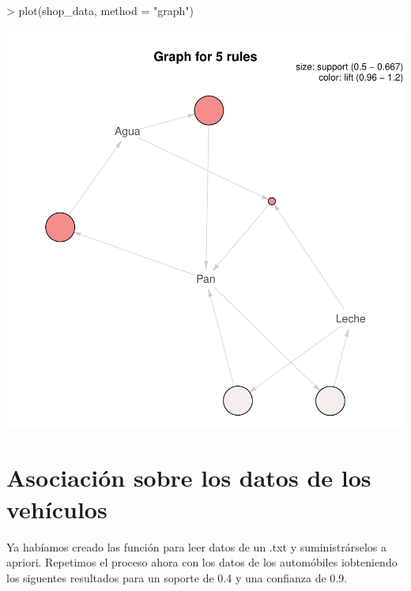 \documentclass [a4paper] {article}
\begin{document}
\begin{center}
\begin{Schunk}
\begin{Sinput}
> plot(shop_data, method = "graph")
\end{Sinput}
\end{Schunk}
\includegraphics{entrega-grafica_apriori_shop_graph}
\end{center}

\section{Asociación sobre los datos de los vehículos}
Ya habíamos creado las función para leer datos de un .txt y suministrárselos a apriori.
Repetimos el proceso ahora con los datos de los automóbiles iobteniendo los siguentes resultados para un soporte de 0.4 y una confianza de 0.9.
\end{document}

